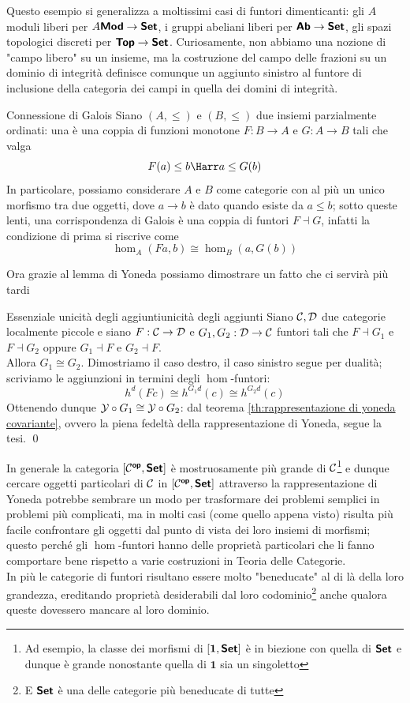 \documentclass[openany]{book}
\renewcommand\C{\mc{C}}
\newcommand\D{\mc{D}}
\begin{document}
Questo esempio si generalizza a moltissimi casi di funtori dimenticanti: gli $A$moduli liberi per $A\text{\sffamily\textbf{Mod}}\to\text{\sffamily\textbf{Set}}$, i gruppi abeliani liberi per $\text{\sffamily\textbf{Ab}}\to\text{\sffamily\textbf{Set}}$, gli spazi topologici discreti per $\text{\sffamily\textbf{Top}}\to\text{\sffamily\textbf{Set}}$. Curiosamente, non abbiamo una nozione di "campo libero" su un insieme, ma la costruzione del campo delle frazioni su un dominio di integrità definisce comunque un aggiunto sinistro al funtore di inclusione della categoria dei campi in quella dei domini di integrità.

\begin{example}{Connessione di Galois}{}
    Siano $(A,\le)$ e $(B,\le)$ due insiemi parzialmente ordinati: una  è una coppia di funzioni monotone $F: B\to A$ e $G:A\to B$ tali che valga
    \[ F(a)\le b \Harr a\le G(b) \]
    In particolare, possiamo considerare $A$ e $B$ come categorie con al più un unico morfismo tra due oggetti, dove $a\to b$ è dato quando esiste da $a\le b$; sotto queste lenti, una corrispondenza di Galois è una coppia di funtori $F \dashv G$, infatti la condizione di prima si riscrive come
    \[ \hom_A(Fa, b) \cong \hom_B(a, G(b)) \]
\end{example}

Ora grazie al lemma di Yoneda possiamo dimostrare un fatto che ci servirà più tardi

\begin{lemma}{Essenziale unicità degli aggiunti}{unicità degli aggiunti}
    Siano $\C,\D$ due categorie localmente piccole e siano $F:\C\to\D$ e $G_1,G_2: \D\to\C$ funtori tali che $F\dashv G_1$ e $F\dashv G_2$ oppure $G_1\dashv F$ e $G_2\dashv F$.\\
    Allora $G_1\cong G_2$.
    \proof 
    Dimostriamo il caso destro, il caso sinistro segue per dualità; scriviamo le aggiunzioni in termini degli $\hom$-funtori:
    \[ h^d(Fc) \cong h^{G_1 d}(c) \cong h^{G_2 d}(c) \]
    Ottenendo dunque $\mathcal{Y}\circ G_1 \cong \mathcal{Y}\circ G_2$: dal teorema \cref{th:rappresentazione di yoneda covariante}, ovvero la piena fedeltà della rappresentazione di Yoneda, segue la tesi.
    \qed
\end{lemma}

In generale la categoria $[\C^\op,\setcat]$ è mostruosamente più grande di $\C$\footnote{Ad esempio, la classe dei morfismi di $[\mathbf{1},\text{\sffamily\textbf{Set}}]$ è in biezione con quella di $\text{\sffamily\textbf{Set}}$ e dunque è grande nonostante quella di $\mathbf{1}$ sia un singoletto} e dunque cercare oggetti particolari di $\C$ in $[\C^\op,\setcat]$ attraverso la rappresentazione di Yoneda potrebbe sembrare un modo per trasformare dei problemi semplici in problemi più complicati, ma in molti casi (come quello appena visto) risulta più facile confrontare gli oggetti dal punto di vista dei loro insiemi di morfismi; questo perché gli $\hom$-funtori hanno delle proprietà particolari che li fanno comportare bene rispetto a varie costruzioni in Teoria delle Categorie.\\
In più le categorie di funtori risultano essere molto "beneducate" al di là della loro grandezza, ereditando proprietà desiderabili dal loro codominio\footnote{E $\text{\sffamily\textbf{Set}}$ è una delle categorie più beneducate di tutte} anche qualora queste dovessero mancare al loro dominio.
\end{document}
